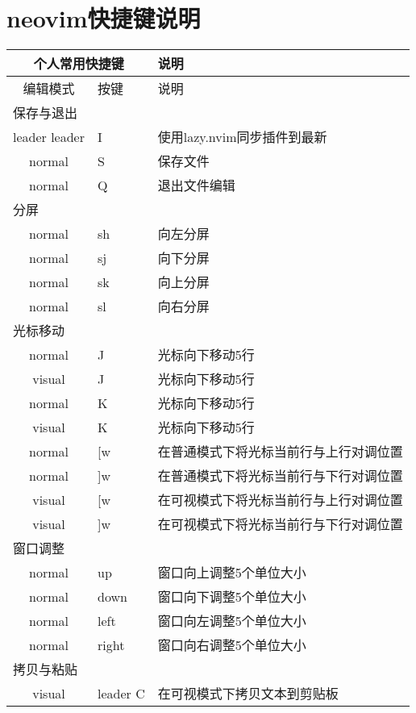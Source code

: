 \documentclass[11pt]{article}
\begin{document}
\section{neovim快捷键说明}
\begin{left}
  \begin{tabular}{|c|l|l|}
    \hline
    \multicolumn{2}{|c|}{\textbf{个人常用快捷键}} & \textbf{说明} \\   
    \hline
    编辑模式 & 按键 & 说明 \\
    \hline \multicolumn{3}{|l|}{保存与退出} \\ \hline
    leader leader & I & 使用lazy.nvim同步插件到最新 \\
    normal & S & 保存文件 \\
    normal & Q & 退出文件编辑 \\
    \hline \multicolumn{3}{|l|}{分屏} \\ \hline    
    normal & sh & 向左分屏 \\
    normal & sj & 向下分屏 \\
    normal & sk & 向上分屏 \\
    normal & sl & 向右分屏 \\
    \hline \multicolumn{3}{|l|}{光标移动} \\ \hline        
    normal & J & 光标向下移动5行 \\
    visual & J & 光标向下移动5行 \\    
    normal & K & 光标向下移动5行 \\
    visual & K & 光标向下移动5行 \\
    normal & [w & 在普通模式下将光标当前行与上行对调位置 \\
    normal & ]w & 在普通模式下将光标当前行与下行对调位置 \\
    visual & [w & 在可视模式下将光标当前行与上行对调位置 \\
    visual & ]w & 在可视模式下将光标当前行与下行对调位置 \\    
    \hline \multicolumn{3}{|l|}{窗口调整} \\ \hline            
    normal & up & 窗口向上调整5个单位大小 \\
    normal & down & 窗口向下调整5个单位大小 \\
    normal & left & 窗口向左调整5个单位大小 \\
    normal & right & 窗口向右调整5个单位大小 \\
    \hline \multicolumn{3}{|l|}{拷贝与粘贴} \\ \hline                
    visual & leader C & 在可视模式下拷贝文本到剪贴板 \\

\end{tabular}
\end{left}
\end{document}
